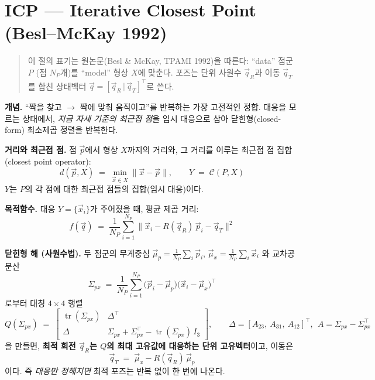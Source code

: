 \section{ICP --- Iterative Closest Point (Besl--McKay 1992)}
\label{sec:icp}

\begin{quote}
  \small 이 절의 표기는 원논문(Besl \& McKay, TPAMI 1992)을 따른다:
  ``data'' 점군 $P$ (점 $N_P$개)를 ``model'' 형상 $X$에 맞춘다. 포즈는
  단위 사원수 $\vec{q}_R$과 이동 $\vec{q}_T$를 합친 상태벡터
  $\vec{q}=[\vec{q}_R\,|\,\vec{q}_T]^{\top}$로 쓴다.
\end{quote}

\textbf{개념.} ``짝을 찾고 $\to$ 짝에 맞춰 움직이고''를 반복하는 가장 고전적인
정합. 대응을 모르는 상태에서, \emph{지금 자세 기준의 최근접 점}을 임시 대응으로
삼아 닫힌형(closed-form) 최소제곱 정렬을 반복한다.

\textbf{거리와 최근접 점.} 점 $\vec{p}$에서 형상 $X$까지의 거리와, 그 거리를
이루는 최근접 점 집합(closest point operator):
\begin{equation*}
  d(\vec{p}, X) \;=\; \min_{\vec{x}\in X} \lVert \vec{x}-\vec{p}\rVert,
  \qquad
  Y \;=\; \mathcal{C}(P, X)
\end{equation*}
$Y$는 $P$의 각 점에 대한 최근접 점들의 집합(임시 대응)이다.

\textbf{목적함수.} 대응 $Y=\{\vec{x}_i\}$가 주어졌을 때, 평균 제곱 거리:
\begin{equation*}
  f(\vec{q}) \;=\; \frac{1}{N_P}\sum_{i=1}^{N_P}
  \big\lVert \vec{x}_i - R(\vec{q}_R)\,\vec{p}_i - \vec{q}_T \big\rVert^2
\end{equation*}

\textbf{닫힌형 해 (사원수법).} 두 점군의 무게중심
$\vec{\mu}_p=\frac{1}{N_P}\sum_i\vec{p}_i$,
$\vec{\mu}_x=\frac{1}{N_P}\sum_i\vec{x}_i$ 와 교차공분산
\begin{equation*}
  \Sigma_{px} \;=\; \frac{1}{N_P}\sum_{i=1}^{N_P}
  \big(\vec{p}_i-\vec{\mu}_p\big)\big(\vec{x}_i-\vec{\mu}_x\big)^{\top}
\end{equation*}
로부터 대칭 $4\times4$ 행렬
\begin{equation*}
  Q(\Sigma_{px}) \;=\;
  \begin{bmatrix}
    \operatorname{tr}(\Sigma_{px}) & \Delta^{\top} \\
    \Delta & \Sigma_{px}+\Sigma_{px}^{\top}
            -\operatorname{tr}(\Sigma_{px})\,I_3
  \end{bmatrix},
  \qquad
  \Delta = [A_{23},\ A_{31},\ A_{12}]^{\top},\ \
  A = \Sigma_{px}-\Sigma_{px}^{\top}
\end{equation*}
을 만들면, \textbf{최적 회전 $\vec{q}_R$는 $Q$의 최대 고유값에 대응하는 단위
고유벡터}이고, 이동은
\begin{equation*}
  \vec{q}_T \;=\; \vec{\mu}_x - R(\vec{q}_R)\,\vec{\mu}_p
\end{equation*}
이다. 즉 \emph{대응만 정해지면} 최적 포즈는 반복 없이 한 번에 나온다.

